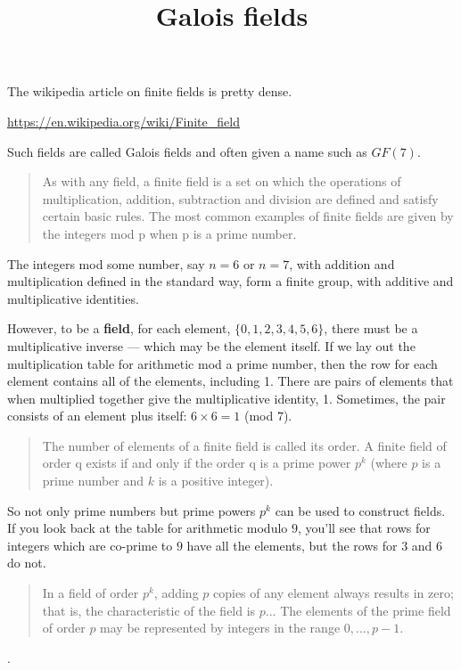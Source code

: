 \documentclass[11pt, oneside]{article}
\title{Galois fields}
\date{}
\begin{document}
\maketitle

\Large

The wikipedia article on finite fields is pretty dense.

\url{https://en.wikipedia.org/wiki/Finite_field}

Such fields are called Galois fields and often given a name such as $GF(7)$.

\begin{quote}As with any field, a finite field is a set on which the operations of multiplication, addition, subtraction and division are defined and satisfy certain basic rules. The most common examples of finite fields are given by the integers mod p when p is a prime number.\end{quote}

The integers mod some number, say $n = 6$ or $n = 7$, with addition and multiplication defined in the standard way, form a finite group, with additive and multiplicative identities.

However, to be a \textbf{field}, for each element, ${\{0,1,2,3,4,5,6\}}$, there must be a multiplicative inverse --- which may be the element itself.  If we lay out the multiplication table for arithmetic mod a prime number, then the row for each element contains all of the elements, including 1.  There are pairs of elements that when multiplied together give the multiplicative identity, 1.  Sometimes, the pair consists of an element plus itself:  $6 \times 6 = 1$ (mod $7$).

\begin{quote}The number of elements of a finite field is called its order. A finite field of order q exists if and only if the order q is a prime power $p^k$ (where $p$ is a prime number and $k$ is a positive integer).\end{quote}

So not only prime numbers but prime powers $p^k$ can be used to construct fields.  If you look back at the table for arithmetic modulo $9$, you'll see that rows for integers which are co-prime to $9$ have all the elements, but the rows for $3$ and $6$ do not.

\begin{quote}In a field of order $p^k$, adding $p$ copies of any element always results in zero; that is, the characteristic of the field is $p$... The elements of the prime field of order $p$ may be represented by integers in the range $0, ..., p-1$.\end{quote}.
\end{document}
